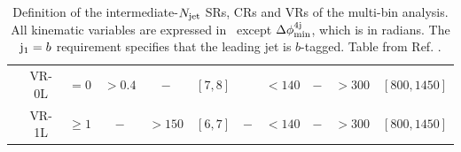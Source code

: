 \begin{landscape}
\begin{table}[htbp]
\begin{tabular}{c c c c c c c c c c c}
			& VR-0L 	& $= 0$  		& $>0.4$ 		& $-$ 		& $[7,8]$		& \cmark		& $<140$ 				& $-$ 		& $> 300 $ 				& $[800,1450]$ \\
			& VR-1L 	& $\ge 1$  	& $-$ 		& $> 150$ 	& $[6,7]$		& $-$		& $<140$				& $-$ 		& $> 300 $  				& $[800,1450]$ \\
      			\bottomrule
    		\end{tabular}
    \caption{Definition of the intermediate-$N_{\mathrm{jet}}$ SRs, CRs and VRs of the multi-bin analysis. All kinematic variables are
                          expressed in \gev\ except $\Delta\phi_{\rm{min}}^{4{\rm{j}}}$, which is in radians. The $\mathrm{j}_1 = b$  requirement specifies that 
                          the leading jet is $b$-tagged.  Table from Ref. \cite{Aaboud:2017hrg}.}
 	\end{table}
\end{landscape}


